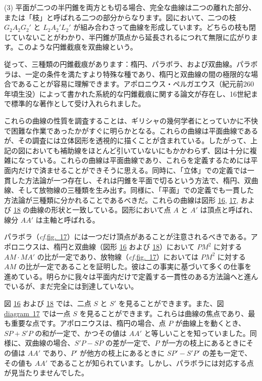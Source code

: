 \documentclass[a4paper,11pt,openany]{ltjsbook}
\providecommand{\FigNum}[1]{\hyperref[fig:#1]{#1}}
\providecommand{\Fig}[2][Fig.]{\hyperref[fig:#2]{#1~#2}}
\providecommand{\cf}{\emph{cf.}}
\begin{document}
(3) 平面が二つの半円錐を両方とも切る場合、完全な曲線は二つの離れた部分、または「枝」と呼ばれる二つの部分からなります。図において、二つの枝 $G_{2}A_{2}G_{2}'$ と $L_{2}A_{2}'L_{2}'$ が組み合わさって曲線を形成しています。どちらの枝も閉じていないことがわかり、半円錐が頂点から延長されるにつれて無限に広がります。このような円錐截痕を双曲線という。

従って、三種類の円錐截痕があります：楕円、パラボラ、および双曲線。パラボラは、一定の条件を満たすより特殊な種であり、楕円と双曲線の間の極限的な場合であることが容易に理解できます。アポロニウス・ペルガエウス（紀元前260年頃生没）によって書かれた系統的な円錐截痕に関する論文が存在し、16世紀まで標準的な著作として受け入れられました。

これらの曲線の性質を調査することは、ギリシャの幾何学者にとっていかに不快で困難な作業であったかがすぐに明らかとなる。これらの曲線は平面曲線であるが、その調査には立体図形を透視的に描くことが含まれている。したがって、上記の図においても補助線をほとんど引いていないにもかかわらず、図は十分に複雑になっている。これらの曲線は平面曲線であり、これらを定義するためには平面内だけで済ませることができそうに思える。同時に、「立体」での定義では一貫した方法論が一つ存在し、それは円錐を平面で切るという方法で、楕円、双曲線、そして放物線の三種類を生み出す。同様に、「平面」での定義でも一貫した方法論が三種類に分かれることであるべきだ。これらの曲線は図形 \FigNum{16}, \FigNum{17}, および \FigNum{18} の曲線の形状と一致している。図形において点 $A$ と $A'$ は頂点と呼ばれ、線分 $AA'$ は主軸と呼ばれる。

パラボラ（\cf \Fig[fig.]{17}）には一つだけ頂点があることが注意されるべきである。アポロニウスは、楕円と双曲線（図形 \FigNum{16} および \FigNum{18}）において $PM^{2}$ に対する $AM·MA'$ の比が一定であり、放物線（\cf \Fig[fig.]{17}）においては $PM^{2}$ に対する $AM$ の比が一定であることを証明した。彼はこの事実に基づいて多くの仕事を進めている。明らかに我々は平面内だけで定義する一貫性のある方法論へと進んでいるが、まだ完全には到達していない。

図 \FigNum{16} および \FigNum{18} では、二点 $S$ と $S'$ を見ることができます。また、図 \Fig[diagram]{17} では一点 $S$ を見ることができます。これらは曲線の焦点であり、最も重要な点です。アポロニウスは、楕円の場合、点 $P$ が曲線上を動くとき、$SP + S'P$ の和が一定で、かつその値は $AA'$ と等しいことを知っていました。同様に、双曲線の場合、$S'P - SP$ の差が一定で、$P$ が一方の枝上にあるときにその値は $AA'$ であり、$P'$ が他方の枝上にあるときに $SP' - S'P'$ の差も一定で、その値も $AA'$ であることが知られています。しかし、パラボラには対応する点が見当たりませんでした。
\end{document}

